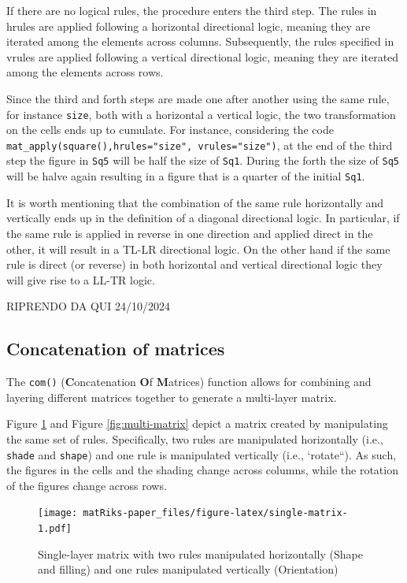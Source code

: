 If there are no logical rules, the procedure enters the third step.
The rules in hrules are applied following a horizontal directional logic, meaning they are iterated among the elements across columns.
Subsequently, the rules specified in vrules are applied following a vertical directional logic, meaning they are iterated among the elements across rows.

Since the third and forth steps are made one after another using the same rule, for instance \texttt{size}, both with a horizontal a vertical logic, the two transformation on the cells ends up to cumulate.
For instance, considering the code \texttt{mat\_apply(square(),hrules="size",\ vrules="size")}, at the end of the third step the figure in \texttt{Sq5} will be half the size of \texttt{Sq1}.
During the forth the size of \texttt{Sq5} will be halve again resulting in a figure that is a quarter of the initial \texttt{Sq1}.

It is worth mentioning that the combination of the same rule horizontally and vertically ends up in the definition of a diagonal directional logic.
In particular, if the same rule is applied in reverse in one direction and applied direct in the other, it will result in a TL-LR directional logic.
On the other hand if the same rule is direct (or reverse) in both horizontal and vertical directional logic they will give rise to a LL-TR logic.

RIPRENDO DA QUI 24/10/2024

\subsection{Concatenation of matrices}\label{concatenation-of-matrices}

The \texttt{com()} (\textbf{C}oncatenation \textbf{O}f \textbf{M}atrices) function allows for combining and layering different matrices together to generate a multi-layer matrix.

Figure \ref{fig:single-matrix} and Figure \ref{fig:multi-matrix} depict a matrix created by manipulating the same set of rules.
Specifically, two rules are manipulated horizontally (i.e., \texttt{shade} and \texttt{shape}) and one rule is manipulated vertically (i.e., `rotate``).
As such, the figures in the cells and the shading change across columns, while the rotation of the figures change across rows.

\begin{figure}
\centering
\texttt{[image: matRiks-paper\_files/figure-latex/single-matrix-1.pdf]}
\caption{\label{fig:single-matrix}Single-layer matrix with two rules manipulated horizontally (Shape and filling) and one rules manipulated vertically (Orientation)}
\end{figure}

